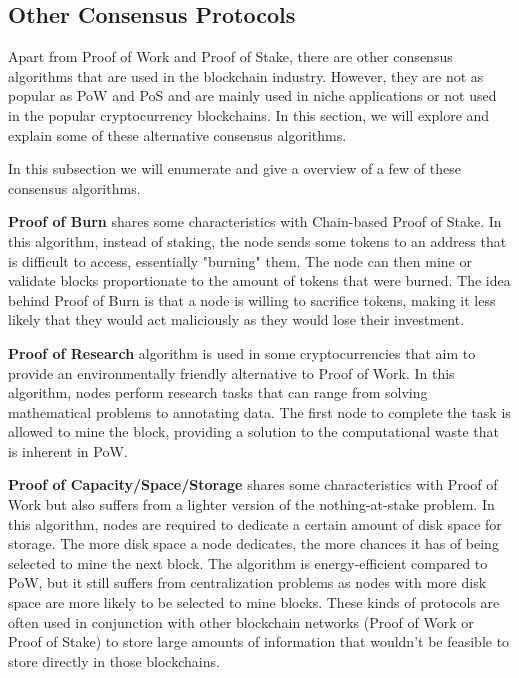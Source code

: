\subsection*{\textbf{Other Consensus Protocols}}

Apart from Proof of Work and Proof of Stake, there are other consensus algorithms that are used in the blockchain industry. However, they are not as popular as PoW and PoS and are mainly used in niche applications or not used in the popular cryptocurrency blockchains. In this section, we will explore and explain some of these alternative consensus algorithms.

In this subsection we will enumerate and give a overview of a few of these consensus algorithms.

\textbf{Proof of Burn} \cite{karantias2020proof} shares some characteristics with Chain-based Proof of Stake. In this algorithm, instead of staking, the node sends some tokens to an address that is difficult to access, essentially "burning" them. The node can then mine or validate blocks proportionate to the amount of tokens that were burned. The idea behind Proof of Burn is that a node is willing to sacrifice tokens, making it less likely that they would act maliciously as they would lose their investment.

\textbf{Proof of Research} \cite{gridcoin} algorithm is used in some cryptocurrencies that aim to provide an environmentally friendly alternative to Proof of Work. In this algorithm, nodes perform research tasks that can range from solving mathematical problems to annotating data. The first node to complete the task is allowed to mine the block, providing a solution to the computational waste that is inherent in PoW.

\textbf{Proof of Capacity/Space/Storage} \cite{dziembowski2015proofs} shares some characteristics with Proof of Work but also suffers from a lighter version of the nothing-at-stake problem. In this algorithm, nodes are required to dedicate a certain amount of disk space for storage. The more disk space a node dedicates, the more chances it has of being selected to mine the next block. The algorithm is energy-efficient compared to PoW, but it still suffers from centralization problems as nodes with more disk space are more likely to be selected to mine blocks. These kinds of protocols are often used in conjunction with other blockchain networks (Proof of Work or Proof of Stake) to store large amounts of information that wouldn't be feasible to store directly in those blockchains.


